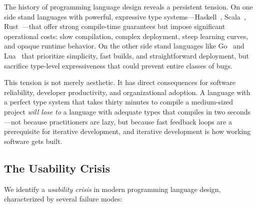 \documentclass[11pt,twocolumn]{article}
\begin{document}
The history of programming language design reveals a persistent tension.
On one side stand languages with powerful, expressive type systems---Haskell~\citep{marlow2010haskell}, Scala~\citep{odersky2004scala}, Rust~\citep{matsakis2014rust}---that offer strong compile-time guarantees but impose significant operational costs: slow compilation, complex deployment, steep learning curves, and opaque runtime behavior.
On the other side stand languages like Go~\citep{pike2012go} and Lua~\citep{ierusalimschy2006lua} that prioritize simplicity, fast builds, and straightforward deployment, but sacrifice type-level expressiveness that could prevent entire classes of bugs.

This tension is not merely aesthetic.
It has direct consequences for software reliability, developer productivity, and organizational adoption.
A language with a perfect type system that takes thirty minutes to compile a medium-sized project \emph{will lose to} a language with adequate types that compiles in two seconds---not because practitioners are lazy, but because fast feedback loops are a prerequisite for iterative development, and iterative development is how working software gets built.

\subsection{The Usability Crisis}

We identify a \emph{usability crisis} in modern programming language design, characterized by several failure modes:
\end{document}
